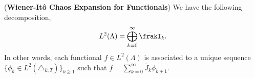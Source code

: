 \begin{theorem}\textnormal{(\textbf{Wiener-Itô Chaos Expansion for Functionals})} 
We have the following decomposition,
$$L^2(\Lambda) = \bigoplus_{k=0}^\infty \bar{\frakI}_k. $$ %
In other words, each functional $f \in L^2(\Lambda)$ is associated to  a unique sequence $\{\phi_k \in L^2(\triangle_{k,T})\}_{k \ge 1}$  such that 
$f= \sum_{k=0}^{\infty} \bar{J}_k \phi_{k+1}. $
\end{theorem}





